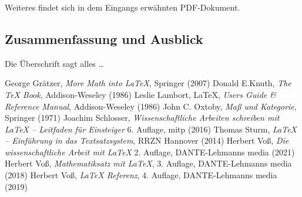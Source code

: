 \subsubsection{}
Weiteres findet sich in dem Eingangs erwähnten PDF-Dokument.

\subsection{Zusammenfassung und Ausblick}
Die Überschrift sagt alles \ldots


\begin{thebibliography}{99}
%
 George Grätzer,  
\emph{More Math into \LaTeX{}}, Springer (2007)
%
 Donald E.Knuth,  
\emph{The \TeX{} Book}, Addison-Weseley (1986)
%
 Leslie Lambort,
{\LaTeX}, \emph{Users Guide \& Reference Manual}, Addison-Weseley (1986) 
%
 John C. Oxtoby,
\emph{Maß und Kategorie}, Springer (1971)
%
 Joachim Schlosser, 
\emph{Wissenschaftliche Arbeiten schreiben mit \LaTeX{} -- Leitfaden für Einsteiger} 6. Auflage, mitp (2016)
%
 Thomas Sturm, 
\emph{\LaTeX{} -- Einführung in das Textsatzsystem}, RRZN Hannover (2014)
%
 Herbert Voß, 
\emph{Die wissenschaftliche Arbeit mit \LaTeX{}} 2. Auflage, DANTE-Lehmanns media  (2021)
%
 Herbert Voß, 
\emph{Mathematiksatz mit \LaTeX{}}, 3. Auflage, DANTE-Lehmanns media (2018)
 Herbert Voß, 
\emph{\LaTeX{} Referenz}, 4. Auflage, DANTE-Lehmanns media  (2019)
\end{thebibliography}

